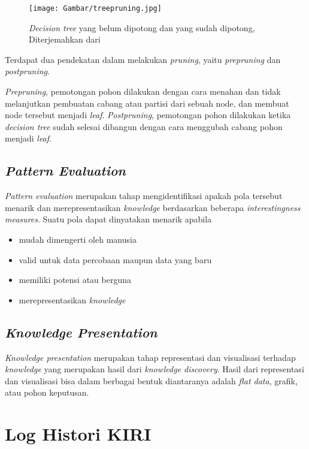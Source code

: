 \begin{figure}
\centering
\texttt{[image: Gambar/treepruning.jpg]}
\caption[\textsl{Decision Tree Pruned}]{\textsl{Decision tree} yang belum dipotong dan yang sudah dipotong, Diterjemahkan dari \cite{DM}} 
\label{fig:treePruning}
\end{figure}

Terdapat dua pendekatan dalam melakukan \textsl{pruning}, yaitu \textsl{prepruning} dan \textsl{postpruning}.

\textsl{Prepruning}, pemotongan pohon dilakukan dengan cara menahan dan tidak melanjutkan pembuatan cabang atau partisi dari sebuah node, dan membuat node tersebut menjadi \textsl{leaf}. \textsl{Postpruning}, pemotongan pohon dilakukan ketika \textsl{decision tree} sudah selesai dibangun dengan cara menggubah cabang pohon menjadi \textsl{leaf}.

\subsection{\textsl{Pattern Evaluation}}
\textsl{Pattern evaluation} merupakan tahap mengidentifikasi apakah pola tersebut menarik dan merepresentasikan \textsl{knowledge} berdasarkan beberapa \textsl{interestingness measures}.
Suatu pola dapat dinyatakan menarik apabila
\begin{itemize}
	\item mudah dimengerti oleh manusia
	\item valid untuk data percobaan maupun data yang baru
	\item memiliki potensi atau berguna
	\item merepresentasikan \textsl{knowledge}
\end{itemize}

\subsection{\textsl{Knowledge Presentation}}
\textsl{Knowledge presentation} merupakan tahap representasi dan visualisasi terhadap \textsl{knowledge} yang merupakan hasil dari \textsl{knowledge discovery}. Hasil dari representasi dan visualisasi bisa dalam berbagai bentuk diantaranya adalah \textsl{flat data}, grafik, atau pohon keputusan.

\section{Log Histori KIRI}

